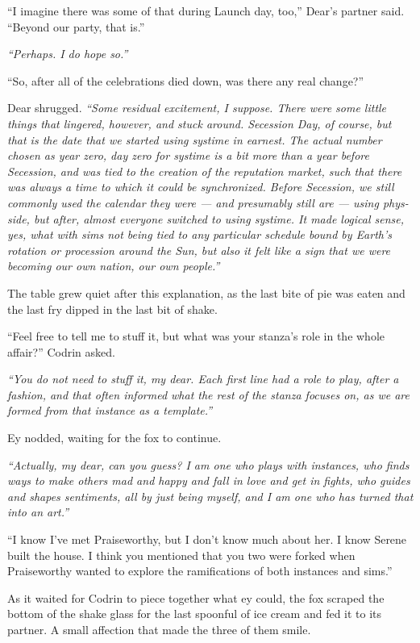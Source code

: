 ``I imagine there was some of that during Launch day, too,'' Dear's partner said. ``Beyond our party, that is.''

\emph{``Perhaps. I do hope so.''}

``So, after all of the celebrations died down, was there any real change?''

Dear shrugged. \emph{``Some residual excitement, I suppose. There were some little things that lingered, however, and stuck around. Secession Day, of course, but that is the date that we started using systime in earnest. The actual number chosen as year zero, day zero for systime is a bit more than a year before Secession, and was tied to the creation of the reputation market, such that there was always a time to which it could be synchronized. Before Secession, we still commonly used the calendar they were — and presumably still are — using phys-side, but after, almost everyone switched to using systime. It made logical sense, yes, what with sims not being tied to any particular schedule bound by Earth's rotation or procession around the Sun, but also it felt like a sign that we were becoming our own nation, our own people.''}

The table grew quiet after this explanation, as the last bite of pie was eaten and the last fry dipped in the last bit of shake.

``Feel free to tell me to stuff it, but what was your stanza's role in the whole affair?'' Codrin asked.

\emph{``You do not need to stuff it, my dear. Each first line had a role to play, after a fashion, and that often informed what the rest of the stanza focuses on, as we are formed from that instance as a template.''}

Ey nodded, waiting for the fox to continue.

\emph{``Actually, my dear, can you guess? I am one who plays with instances, who finds ways to make others mad and happy and fall in love and get in fights, who guides and shapes sentiments, all by just being myself, and I am one who has turned that into an art.''}

``I know I've met Praiseworthy, but I don't know much about her. I know Serene built the house. I think you mentioned that you two were forked when Praiseworthy wanted to explore the ramifications of both instances and sims.''

As it waited for Codrin to piece together what ey could, the fox scraped the bottom of the shake glass for the last spoonful of ice cream and fed it to its partner. A small affection that made the three of them smile.

